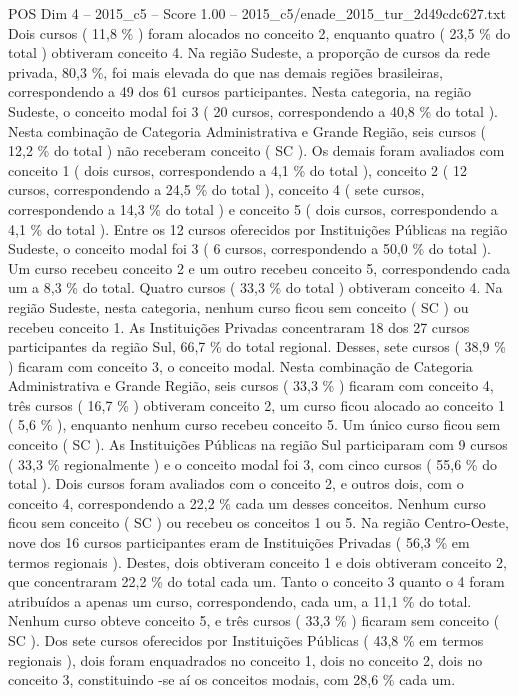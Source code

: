 \begin{textsample}{POS Dim 4 – 2015\_c5 – Score 1.00 – 2015\_c5/enade\_2015\_tur\_2d49cdc627.txt}
Dois cursos ( 11,8 \% ) foram alocados no conceito 2, enquanto quatro ( 23,5 \% do total ) obtiveram conceito 4.
Na região Sudeste, a proporção de cursos da rede privada, 80,3 \%, foi mais elevada do que nas demais regiões brasileiras, correspondendo a 49 dos 61 cursos participantes.
Nesta categoria, na região Sudeste, o conceito modal foi 3 ( 20 cursos, correspondendo a 40,8 \% do total ).
Nesta combinação de Categoria Administrativa e Grande Região, seis cursos ( 12,2 \% do total ) não receberam conceito ( SC ).
Os demais foram avaliados com conceito 1 ( dois cursos, correspondendo a 4,1 \% do total ), conceito 2 ( 12 cursos, correspondendo a 24,5 \% do total ), conceito 4 ( sete cursos, correspondendo a 14,3 \% do total ) e conceito 5 ( dois cursos, correspondendo a 4,1 \% do total ).
Entre os 12 cursos oferecidos por Instituições Públicas na região Sudeste, o conceito modal foi 3 ( 6 cursos, correspondendo a 50,0 \% do total ).
Um curso recebeu conceito 2 e um outro recebeu conceito 5, correspondendo cada um a 8,3 \% do total.
Quatro cursos ( 33,3 \% do total ) obtiveram conceito 4.
Na região Sudeste, nesta categoria, nenhum curso ficou sem conceito ( SC ) ou recebeu conceito 1.
As Instituições Privadas concentraram 18 dos 27 cursos participantes da região Sul, 66,7 \% do total regional.
Desses, sete cursos ( 38,9 \% ) ficaram com conceito 3, o conceito modal.
Nesta combinação de Categoria Administrativa e Grande Região, seis cursos ( 33,3 \% ) ficaram com conceito 4, três cursos ( 16,7 \% ) obtiveram conceito 2, um curso ficou alocado ao conceito 1 ( 5,6 \% ), enquanto nenhum curso recebeu conceito 5.
Um único curso ficou sem conceito ( SC ).
As Instituições Públicas na região Sul participaram com 9 cursos ( 33,3 \% regionalmente ) e o conceito modal foi 3, com cinco cursos ( 55,6 \% do total ).
Dois cursos foram avaliados com o conceito 2, e outros dois, com o conceito 4, correspondendo a 22,2 \% cada um desses conceitos.
Nenhum curso ficou sem conceito ( SC ) ou recebeu os conceitos 1 ou 5.
Na região Centro-Oeste, nove dos 16 cursos participantes eram de Instituições Privadas ( 56,3 \% em termos regionais ).
Destes, dois obtiveram conceito 1 e dois obtiveram conceito 2, que concentraram 22,2 \% do total cada um.
Tanto o conceito 3 quanto o 4 foram atribuídos a apenas um curso, correspondendo, cada um, a 11,1 \% do total.
Nenhum curso obteve conceito 5, e três cursos ( 33,3 \% ) ficaram sem conceito ( SC ).
Dos sete cursos oferecidos por Instituições Públicas ( 43,8 \% em termos regionais ), dois foram enquadrados no conceito 1, dois no conceito 2, dois no conceito 3, constituindo -se aí os conceitos modais, com 28,6 \% cada um.

\end{textsample}
